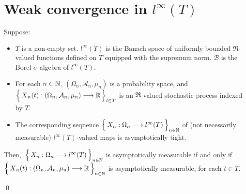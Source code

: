 

\section{Weak convergence in $l^{\infty}(T)$}
\setcounter{theorem}{0}
\setcounter{equation}{0}


\renewcommand{\theenumi}{\roman{enumi}}
\renewcommand{\labelenumi}{\textnormal{(\theenumi)}$\;\;$}


\begin{lemma}
\mbox{}\vskip 0.1cm
\noindent
Suppose:
\begin{itemize}
\item
	$T$ is a non-empty set.
	$l^{\infty}(T)$ is the Banach space of uniformly bounded $\Re$-valued functions defined on $T$
	equipped with the supremum norm.
	$\mathcal{B}$ is the Borel $\sigma$-algebra of $l^{\infty}(T)$.
\item
	For each $n\in\mathbb{N}$, $(\Omega_{n},\mathcal{A}_{n},\mu_{n})$ is a probability space, and
	\,$\left\{\,\overset{{\color{white}.}}{X}_{n}(t):(\Omega_{n},\mathcal{A}_{n},\mu_{n})\longrightarrow\Re\,\right\}_{t\in T}$
	is an $\Re$-valued stochastic process indexed by $T$.
\item
	The corresponding sequence
	$\left\{\,
		X_{n} : \Omega_{n}
		\overset{{\color{white}-}}{\longrightarrow}
		l^{\infty}(T)\,\right\}_{n\in\N}$
	of (not necessarily measurable) $l^{\infty}(T)$-valued maps
	is asymptotically tight.
\end{itemize}
Then,
\,$\left\{\,X_{n} : \Omega_{n}\overset{{\color{white}-}}{\longrightarrow}l^{\infty}(T)\,\right\}_{n\in\N}$
is asymptotically measurable if and only if
\,$\left\{\,\overset{{\color{white}.}}{X}_{n}(t) : (\Omega_{n},\mathcal{A}_{n},\mu_{n}) \longrightarrow \Re\,\right\}_{n\in\N}$
is asymptotically measurable, for each $t \in T$.
\end{lemma}
\proof
\qed


